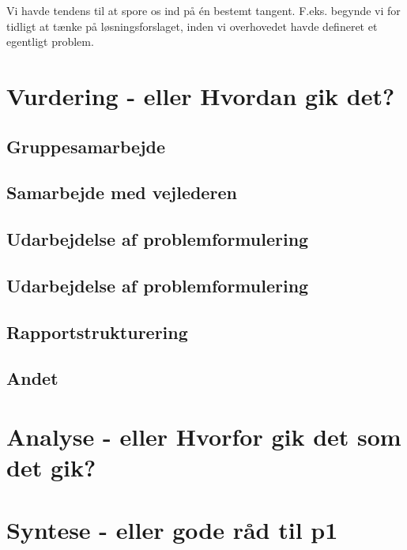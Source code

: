Vi havde tendens til at spore os ind på én bestemt tangent. F.eks. begynde vi for tidligt at tænke på løsningsforslaget, inden vi overhovedet havde defineret et egentligt problem.



\section{Vurdering - eller Hvordan gik det?}

\subsection{Gruppesamarbejde}

\subsection{Samarbejde med vejlederen}

\subsection{Udarbejdelse af problemformulering}


\subsection{Udarbejdelse af problemformulering}

\subsection{Rapportstrukturering}

\subsection{Andet}

\section{Analyse - eller Hvorfor gik det som det gik?}



\section{Syntese - eller gode råd til p1}








